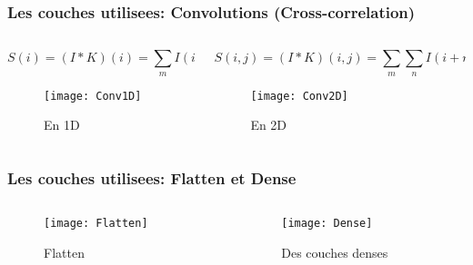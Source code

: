 \begin{frame}
    \frametitle{Les couches utilisees: Convolutions (Cross-correlation)}
    \begin{columns}
        \begin{column}{0.4\textwidth}
            \scriptsize
            \begin{equation*}
                S(i) = (I * K)(i) = \sum_{m} I(i+m)K(m)
                \label{eqn:Corr2D}
            \end{equation*}
            \begin{figure}
                \texttt{[image: Conv1D]}
                \caption{En 1D \parencite{Reference10}}
            \end{figure}
        \end{column}
        \begin{column}{0.6\textwidth}
            \scriptsize
            \begin{equation*}
                S(i,j) = (I * K)(i,j) = \sum_{m}\sum_{n} I(i+m,j+n)K(m,n)
                \label{eqn:Corr2D}
            \end{equation*}
            \begin{figure}
                \texttt{[image: Conv2D]}
                \caption{En 2D \parencite{Reference11}}
            \end{figure}
        \end{column}
    \end{columns}
\end{frame}

\begin{frame}
    \frametitle{Les couches utilisees: Flatten et Dense}
    \begin{columns}
        \begin{column}{0.4\textwidth}
            \begin{figure}
                \texttt{[image: Flatten]}
                \caption{Flatten}
            \end{figure}
        \end{column}
        \begin{column}{0.6\textwidth}
            \begin{figure}
                \texttt{[image: Dense]}
                \caption{Des couches denses}
            \end{figure}
        \end{column}
    \end{columns}
\end{frame}


